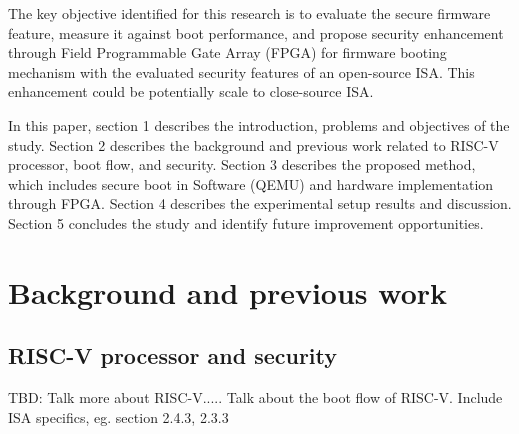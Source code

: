 \documentclass[a4paper,fleqn]{cas-dc}
\begin{document}
The key objective identified for this research is to
evaluate the secure firmware feature, measure it against boot performance, and propose
security enhancement through Field Programmable Gate Array (FPGA) for firmware booting
mechanism with the evaluated security features of an open-source ISA. This enhancement
could be potentially scale to close-source ISA.

In this paper, section 1 describes the introduction, problems and objectives of the study.
Section 2 describes the background and previous work related to RISC-V processor, boot flow, and
security. Section 3 describes the proposed method, which includes secure boot in Software (QEMU)
and hardware implementation through FPGA. Section 4 describes the experimental setup results and
discussion. Section 5 concludes the study and identify future improvement opportunities.

\section{ Background and previous work}

\subsection{ RISC-V processor and security}
TBD: Talk more about RISC-V..... Talk about the boot flow of RISC-V.
Include ISA specifics, eg. section 2.4.3,  2.3.3
\end{document}
